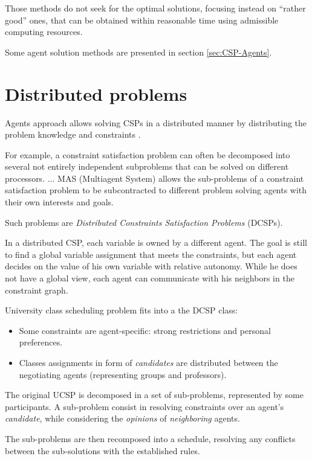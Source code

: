 \documentclass[ThesisDoc]{subfiles}
\begin{document}
\medskip

Those methods do not seek for the optimal solutions, focusing instead on
``rather good'' ones, that can be obtained within reasonable time using admissible
computing resources.

\bigskip

\noindent
Some agent solution methods are presented in section \ref{sec:CSP-Agents}.




\section{Distributed problems}
Agents approach allows solving CSPs in a distributed manner by distributing
the problem knowledge and constraints
\cite{DCSPagent1998, DCSP2013, CSPagent2014, MAS, MAS-Survey}.

\begin{displayquote} %
  For example, a constraint satisfaction problem can often be
  decomposed into several not entirely independent
  subproblems that can be solved on different processors. $\dots$
  MAS (Multiagent System) allows the sub-problems of a constraint satisfaction
  problem to be subcontracted to different problem solving agents with their own
  interests and goals.
\end{displayquote}

\noindent
Such problems are \emph{Distributed Constraints Satisfaction Problems} (DCSPs).
\begin{displayquote} %
  In a distributed CSP, each variable is owned by a different agent. The goal is
  still to find a global variable assignment that meets the constraints, but each agent
  decides on the value of his own variable with relative autonomy. While he does
  not have a global view, each agent can communicate with his neighbors in the
  constraint graph.
\end{displayquote}


University class scheduling problem fits into a the DCSP class:
\begin{itemize}
  \item Some constraints are agent-specific: strong restrictions and
        personal preferences.
  \item Classes assignments in form of \emph{candidates} are distributed between
        the negotiating agents (representing groups and professors).
\end{itemize}

The original UCSP is decomposed in a set of sub-problems, represented by some
participants. A sub-problem consist in resolving constraints over an agent's
\emph{candidate}, while considering the \emph{opinions} of \emph{neighboring}
agents.

The sub-problems are then recomposed into a schedule, resolving any conflicts
between the sub-solutions with the established rules.
\end{document}
